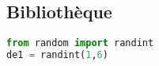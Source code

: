 \documentclass[a4paper,11pt]{article}
\begin{document}
\subsection{Bibliothèque}
\begin{center}
    \begin{lstlisting}[language=Python , basicstyle=\ttfamily, xleftmargin=2em, xrightmargin=2em]
from random import randint
de1 = randint(1,6)
\end{lstlisting}
    \label{aleatoire}
    \end{center}
\end{document}
